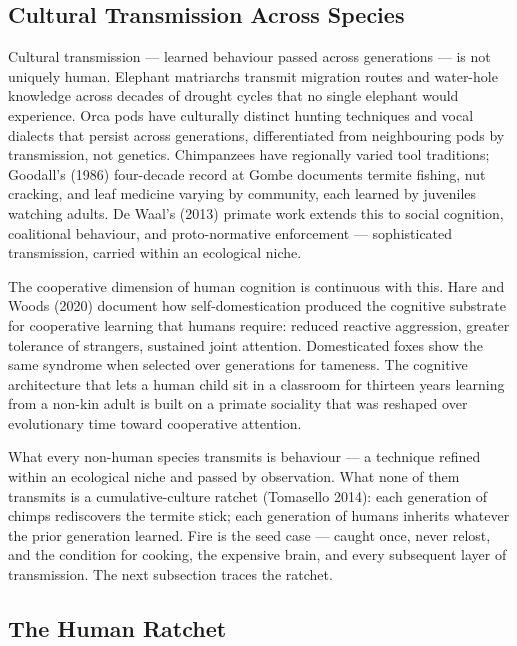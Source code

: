 \documentclass[12pt,letterpaper]{article}
\begin{document}
\subsection{Cultural Transmission Across Species}\label{cultural-transmission-across-species}

Cultural transmission --- learned behaviour passed across generations
--- is not uniquely human. Elephant matriarchs transmit migration
routes and water-hole knowledge across decades of drought cycles that
no single elephant would experience. Orca pods have culturally
distinct hunting techniques and vocal dialects that persist across
generations, differentiated from neighbouring pods by transmission,
not genetics. Chimpanzees have regionally varied tool traditions;
Goodall's (1986) four-decade record at Gombe documents termite
fishing, nut cracking, and leaf medicine varying by community, each
learned by juveniles watching adults. De Waal's (2013) primate work
extends this to social cognition, coalitional behaviour, and
proto-normative enforcement --- sophisticated transmission, carried
within an ecological niche.

The cooperative dimension of human cognition is continuous with this.
Hare and Woods (2020) document how self-domestication produced the
cognitive substrate for cooperative learning that humans require:
reduced reactive aggression, greater tolerance of strangers, sustained
joint attention. Domesticated foxes show the same syndrome when
selected over generations for tameness. The cognitive architecture
that lets a human child sit in a classroom for thirteen years
learning from a non-kin adult is built on a primate sociality that
was reshaped over evolutionary time toward cooperative attention.

What every non-human species transmits is behaviour --- a technique
refined within an ecological niche and passed by observation. What
none of them transmits is a cumulative-culture ratchet
(Tomasello 2014): each generation of chimps rediscovers the termite
stick; each generation of humans inherits whatever the prior
generation learned. Fire is the seed case --- caught once, never
relost, and the condition for cooking, the expensive brain, and every
subsequent layer of transmission. The next subsection traces the
ratchet.

\subsection{The Human Ratchet}\label{the-human-ratchet}
\end{document}
